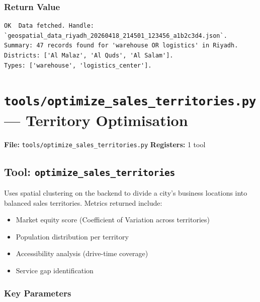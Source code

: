 \documentclass[12pt,a4paper]{report}
\begin{document}
\subsubsection{Return Value}

\begin{lstlisting}[language={},caption={Example return value}]
OK  Data fetched. Handle: `geospatial_data_riyadh_20260418_214501_123456_a1b2c3d4.json`.
Summary: 47 records found for 'warehouse OR logistics' in Riyadh.
Districts: ['Al Malaz', 'Al Quds', 'Al Salam'].
Types: ['warehouse', 'logistics_center'].
\end{lstlisting}

\section{\texttt{tools/optimize\_sales\_territories.py} --- Territory Optimisation}

\begin{mdframed}[style=filebox]
\textbf{File:} \texttt{tools/optimize\_sales\_territories.py} \quad \textbf{Registers:} 1 tool
\end{mdframed}

\subsection{Tool: \texttt{optimize\_sales\_territories}}

Uses spatial clustering on the backend to divide a city's business locations
into balanced sales territories. Metrics returned include:

\begin{itemize}[noitemsep]
  \item Market equity score (Coefficient of Variation across territories)
  \item Population distribution per territory
  \item Accessibility analysis (drive-time coverage)
  \item Service gap identification
\end{itemize}

\subsubsection{Key Parameters}
\end{document}
